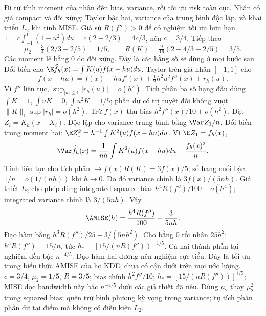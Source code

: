 \begin{solution}
Đi từ tính moment của nhân đến bias, variance, rồi tối ưu risk toàn cục.
Nhân có giá compact và đối xứng; Taylor bậc hai, variance của trung bình độc lập, và khai triển $L_2$ khi tính MISE. Giả sử $R(f'')>0$ để có nghiệm tối ưu hữu hạn.
$1=c\int_{-1}^1(1-u^2)du=c(2-2/3)=4c/3$, nên $c=3/4$.
Tiếp theo
\[
 \mu_2=\tfrac34(2/3-2/5)=1/5,\qquad
 R(K)=\tfrac9{16}(2-4/3+2/5)=3/5.
\]
Các moment lẻ bằng 0 do đối xứng. Đây là các hằng số sẽ dùng ở mọi bước sau.
Đổi biến cho $\E\widehat f_h(x)=\int K(u)f(x-hu)du$.
Taylor trên giá nhân $[-1,1]$ cho
\[
 f(x-hu)=f(x)-hu f'(x)+\tfrac12h^2u^2f''(x)+r_h(u).
\]
Vì $f''$ liên tục, $\sup_{|u|\le1}|r_h(u)|=o(h^2)$. Tích phân ba số hạng đầu dùng $\int K=1$, $\int uK=0$, $\int u^2K=1/5$; phần dư có trị tuyệt đối không vượt $\|K\|_1\sup|r_h|=o(h^2)$. Trừ $f(x)$ thu bias $h^2f''(x)/10+o(h^2)$.
Đặt $Z_i=K_h(x-X_i)$. Độc lập cho variance trung bình bằng $\Var Z_1/n$.
Đổi biến trong moment hai: $\E Z_1^2=h^{-1}\int K^2(u)f(x-hu)du$.
Vì $\E Z_1=f_h(x)$,
\[
 \Var\widehat f_h(x)=\frac1{nh}\int K^2(u)f(x-hu)du-\frac{f_h(x)^2}{n}.
\]
Tính liên tục cho tích phân $\to f(x)R(K)=3f(x)/5$; số hạng cuối bậc $1/n=o(1/(nh))$ khi $h\to0$. Do đó variance chính là $3f(x)/(5nh)$.
Giả thiết $L_2$ cho phép dùng integrated squared bias $h^4R(f'')/100+o(h^4)$; integrated variance chính là $3/(5nh)$. Vậy
\[
 \AMISE(h)=\frac{h^4R(f'')}{100}+\frac3{5nh}.
\]
Đạo hàm bằng $h^3R(f'')/25-3/(5nh^2)$. Cho bằng 0 rồi nhân $25h^2$:
$h^5R(f'')=15/n$, tức $h_*=[15/(nR(f''))]^{1/5}$.
Cả hai thành phần tại nghiệm đều bậc $n^{-4/5}$. Đạo hàm hai dương nên nghiệm cực tiểu. Đây là tối ưu trong biểu thức AMISE của họ KDE, chưa có cận dưới trên mọi ước lượng.
$c=3/4$, $\mu_2=1/5$, $R=3/5$; bias chính $h^2f''/10$; $h_*=[15/(nR(f''))]^{1/5}$; MISE dọc bandwidth này bậc $n^{-4/5}$ dưới các giả thiết đã nêu.
Dùng $\mu_2$ thay $\mu_2^2$ trong squared bias; quên trừ bình phương kỳ vọng trong variance; tự tích phân phần dư tại điểm mà không có điều kiện $L_2$.
\end{solution}

